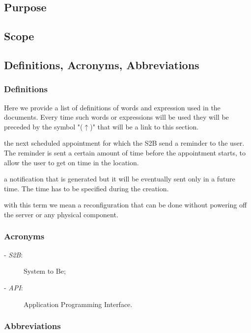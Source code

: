 \subsection{Purpose}
	
\subsection{Scope}
	
\subsection{Definitions, Acronyms, Abbreviations}
	\subsubsection{Definitions}
	\label{definitions}
	Here we provide a list of definitions of words and expression used in the documents. Every time such words or expressions will be used they will be preceded by the symbol "($\uparrow$)" that will be a link to this section.
	\begin{description}[before={\renewcommand{\makelabel}[1]{-- \textbf{\textit{##1}}:}}]
		\item[Incoming Appointment] the next scheduled appointment for which the S2B send a reminder to the user. The reminder is sent  a certain amount of time before the appointment starts, to allow the user to get on time in the location.
		\item[Future Notification] a notification that is generated but it will be eventually sent only in a future time. The time has to be specified during the creation.
		\item[Dynamic Configuration] with this term we mean a reconfiguration that can be done without powering off the server or any physical component.
	\end{description}
	\subsubsection{Acronyms}
			\begin{description}
		\item[- \textit{S2B}:] System to Be;
		\item[- \textit{API}:] Application Programming Interface.
	\end{description}
	\subsubsection{Abbreviations}
	
